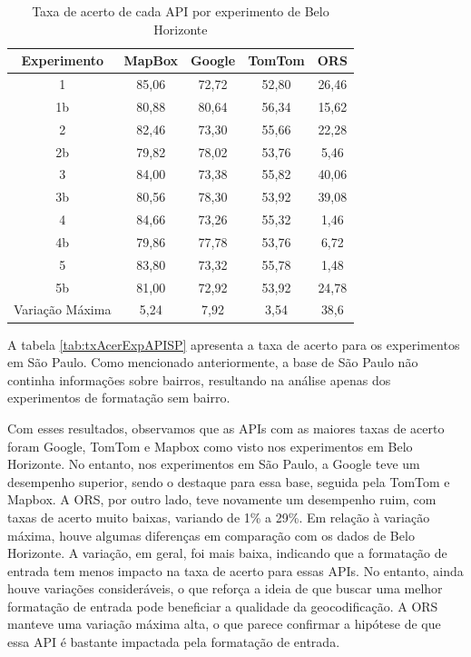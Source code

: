 \begin{table}[!ht]
    \centering
    \caption{Taxa de acerto de cada API por experimento de Belo Horizonte}
    \label{tab:txAcerExpAPIBH}
    \begin{adjustbox}{width=0.7\textwidth}
    \begin{tabular}{|c|c|c|c|c|}
    \hline
    Experimento & MapBox & Google & TomTom & ORS\\
    \hline
    1 & 85,06 & 72,72 & 52,80 & 26,46\\
    \hline
    1b & 80,88 & 80,64 & 56,34 & 15,62\\
    \hline
    2 & 82,46 & 73,30 & 55,66 & 22,28\\
    \hline
    2b & 79,82 & 78,02 & 53,76 & 5,46\\
    \hline
    3 & 84,00 & 73,38 & 55,82 & 40,06\\
    \hline
    3b & 80,56 & 78,30 & 53,92 & 39,08\\
    \hline
    4 & 84,66 & 73,26 & 55,32 & 1,46\\
    \hline
    4b & 79,86 & 77,78 & 53,76 & 6,72\\
    \hline
    5 & 83,80 & 73,32 & 55,78 & 1,48\\
    \hline
    5b & 81,00 & 72,92 & 53,92 & 24,78\\
    \hline
    Variação Máxima & 5,24 & 7,92 & 3,54 & 38,6\\
    \hline
    \end{tabular}
    \end{adjustbox}
\end{table}

A tabela \ref{tab:txAcerExpAPISP} apresenta a taxa de acerto para os experimentos em São Paulo. Como mencionado anteriormente, a base de São Paulo não continha informações sobre bairros, resultando na análise apenas dos experimentos de formatação sem bairro.

Com esses resultados, observamos que as APIs com as maiores taxas de acerto foram Google, TomTom e Mapbox como visto nos experimentos em Belo Horizonte. No entanto, nos experimentos em São Paulo, a Google teve um desempenho superior, sendo o destaque para essa base, seguida pela TomTom e Mapbox. A ORS, por outro lado, teve novamente um desempenho ruim, com taxas de acerto muito baixas, variando de 1\% a 29\%. Em relação à variação máxima, houve algumas diferenças em comparação com os dados de Belo Horizonte. A variação, em geral, foi mais baixa, indicando que a formatação de entrada tem menos impacto na taxa de acerto para essas APIs. No entanto, ainda houve variações consideráveis, o que reforça a ideia de que buscar uma melhor formatação de entrada pode beneficiar a qualidade da geocodificação. A ORS manteve uma variação máxima alta, o que parece confirmar a hipótese de que essa API é bastante impactada pela formatação de entrada.

